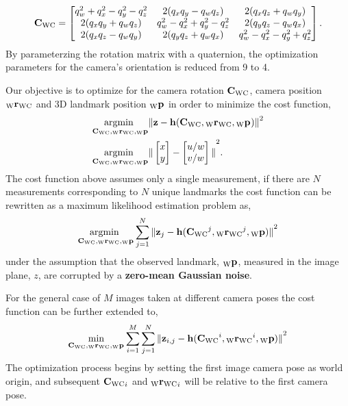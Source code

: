 \begin{equation}
  \camRot = \begin{bmatrix}
    q_{w}^{2} + q_{x}^{2} - q_{y}^{2} - q_{z}^{2}
    & 2 (q_{x} q_{y} - q_{w} q_{z})
    & 2 (q_{x} q_{z} + q_{w} q_{y}) \\
    2 (q_{x} q_{y} + q_{w} q_{z})
    & q_{w}^{2} - q_{x}^{2} + q_{y}^{2} - q_{z}^{2}
    & 2 (q_{y} q_{z} - q_{w} q_{x}) \\
    2 (q_{x} q_{z} - q_{w} q_{y})
    & 2 (q_{y} q_{z} + q_{w} q_{x})
    & q_{w}^{2} - q_{x}^{2} - q_{y}^{2} + q_{z}^{2}
  \end{bmatrix}.
\end{equation}
%
By parameterzing the rotation matrix with a quaternion, the optimization
parameters for the camera's orientation is reduced from 9 to 4.

Our objective is to optimize for the camera rotation $\camRot$, camera
position $\camPos$ and 3D landmark position $\Pt{\world}$ in order to
minimize the cost function,
%
\begin{align}
  &\Argmin{\camRot, \camPos, \Pt{\world}} \Norm{
    \measurement - \projFunc(\camRot, \camPos, \Pt{\world})
  }^{2} \\
  &\Argmin{\camRot, \camPos, \Pt{\world}} \Norm{
    \begin{bmatrix} x \\ y \end{bmatrix} -
    \begin{bmatrix} u / w \\ v / w \end{bmatrix}
    }^{2}.
\end{align}
%
The cost function above assumes only a single measurement, if there are $N$
measurements corresponding to $N$ unique landmarks the cost function can be
rewritten as a maximum likelihood estimation problem as,
%
\begin{equation}
  \Argmin{\camRot, \camPos, \Pt{\world}}
  \sum_{j = 1}^{N}
  \Norm{
    \measurement_{j} - \projFunc(\camRot^{j}, \camPos^{j}, \Point{\world}{j})
  }^{2}
\end{equation}
%
under the assumption that the observed landmark, $\Pt{\world}$, measured in
the image plane, $z$, are corrupted by a \textbf{zero-mean Gaussian noise}.

For the general case of $M$ images taken at different camera poses the cost
function can be further extended to,
%
\begin{equation}
  \min_{\camRot, \camPos, \Pt{\world}} 
  \sum_{i = 1}^{M} \sum_{j = 1}^{N}
  \Norm{
    \measurement_{i, j}
    - \projFunc(\camRot^{i}, \camPos^{i}, \Point{\world}{j})
  }^{2}
\end{equation}
%
The optimization process begins by setting the first image camera pose as world
origin, and subsequent $\camRot_{i}$ and $\camPos_{i}$ will be relative to the
first camera pose.


